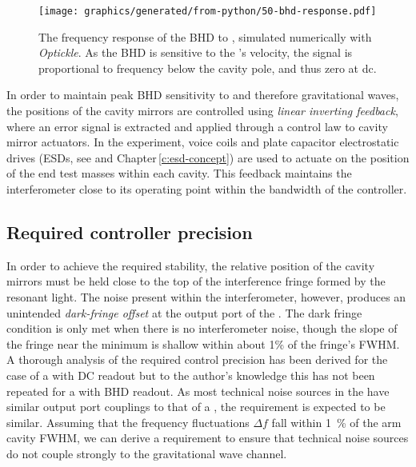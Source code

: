 \begin{figure}
  \centering
  \texttt{[image: graphics/generated/from-python/50-bhd-response.pdf]}
  \caption[The frequency response of the differential arm cavity degree of freedom to the balanced homodyne readout]{\label{fig:bhd-response}The frequency response of the BHD to \LMINUS{}, simulated numerically with \emph{Optickle}. As the BHD is sensitive to the \SSM{}'s velocity, the signal is proportional to frequency below the cavity pole, and thus zero at dc.}
\end{figure}

In order to maintain peak \gls{BHD} sensitivity to \LMINUS{} and therefore gravitational waves, the positions of the cavity mirrors are controlled using \emph{linear inverting feedback}, where an error signal is extracted and applied through a control law to cavity mirror actuators. In the experiment, voice coils and plate capacitor electrostatic drives (\glspl{ESD}, see \cite{Wittel2015} and Chapter\,\ref{c:esd-concept}) are used to actuate on the position of the end test masses within each cavity. This feedback maintains the interferometer close to its operating point within the bandwidth of the controller.
   

\subsection{\label{sec:ssm-required-control}Required controller precision}

In order to achieve the required stability, the relative position of the cavity mirrors must be held close to the top of the interference fringe formed by the resonant light. The noise present within the interferometer, however, produces an unintended \emph{dark-fringe offset} at the output port of the \SSM{}. The dark fringe condition is only met when there is no interferometer noise, though the slope of the fringe near the minimum is shallow within about 1\% of the fringe's \gls{FWHM}. A thorough analysis of the required control precision has been derived for the case of a \DRFPMI{} with \gls{DC} readout \cite{Vajente2011} but to the author's knowledge this has not been repeated for a \SSM{} with \gls{BHD} readout. As most technical noise sources in the \SSM{} have similar output port couplings to that of a \MI{}, the requirement is expected to be similar. Assuming that the frequency fluctuations $\Delta f$ fall within \SI{1}{\percent} of the arm cavity \gls{FWHM}, we can derive a requirement to ensure that technical noise sources do not couple strongly to the gravitational wave channel.

